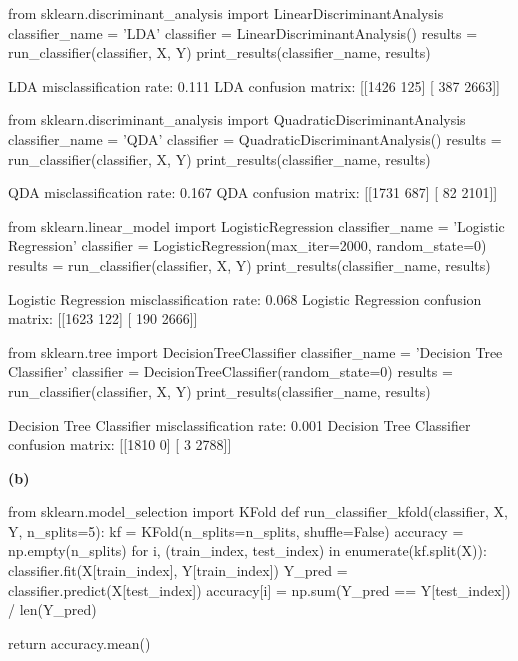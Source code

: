 \begin{python}
from sklearn.discriminant_analysis import LinearDiscriminantAnalysis
classifier_name = 'LDA'
classifier = LinearDiscriminantAnalysis()
results = run_classifier(classifier, X, Y)
print_results(classifier_name, results)
\end{python}
\begin{console}
LDA misclassification rate: 0.111
LDA confusion matrix:
[[1426  125]
 [ 387 2663]]
\end{console}

\begin{python}
from sklearn.discriminant_analysis import QuadraticDiscriminantAnalysis
classifier_name = 'QDA'
classifier = QuadraticDiscriminantAnalysis()
results = run_classifier(classifier, X, Y)
print_results(classifier_name, results)
\end{python}
\begin{console}
QDA misclassification rate: 0.167
QDA confusion matrix:
[[1731  687]
 [  82 2101]]
\end{console}

\begin{python}
from sklearn.linear_model import LogisticRegression
classifier_name = 'Logistic Regression'
classifier = LogisticRegression(max_{i}ter=2000, random_state=0)
results = run_classifier(classifier, X, Y)
print_results(classifier_name, results)
\end{python}
\begin{console}
Logistic Regression misclassification rate: 0.068
Logistic Regression confusion matrix:
[[1623  122]
 [ 190 2666]]
\end{console}

\begin{python}
from sklearn.tree import DecisionTreeClassifier
classifier_name = 'Decision Tree Classifier'
classifier = DecisionTreeClassifier(random_state=0)
results = run_classifier(classifier, X, Y)
print_results(classifier_name, results)
\end{python}
\begin{console}
Decision Tree Classifier misclassification rate: 0.001
Decision Tree Classifier confusion matrix:
[[1810    0]
 [   3 2788]]
\end{console}
\textbf{(b)}

\begin{python}
from sklearn.model_selection import KFold
def run_classifier_{k}fold(classifier, X, Y, n_splits=5):
    kf = KFold(n_splits=n_splits, shuffle=False)
    accuracy = np.empty(n_splits)
    for i, (train_{i}ndex, test_{i}ndex) in enumerate(kf.split(X)):
        classifier.fit(X[train_{i}ndex], Y[train_{i}ndex])
        Y_pred = classifier.predict(X[test_{i}ndex])
        accuracy[i] = np.sum(Y_pred == Y[test_{i}ndex]) / len(Y_pred)
    
    return accuracy.mean()
\end{python}

